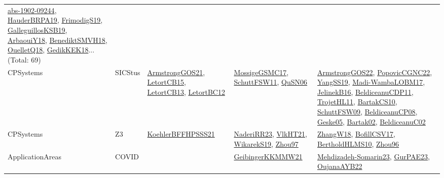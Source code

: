 {\begin{longtable}{lp{3cm}>{\raggedright}p{6cm}>{\raggedright}p{6cm}p{8cm}}
\href{articles/abs-1902-09244.pdf}{abs-1902-09244}\cite{abs-1902-09244}, \href{articles/HauderBRPA19.pdf}{HauderBRPA19}\cite{HauderBRPA19}, \href{papers/FrimodigS19.pdf}{FrimodigS19}\cite{FrimodigS19}, \href{papers/GalleguillosKSB19.pdf}{GalleguillosKSB19}\cite{GalleguillosKSB19}, \href{papers/ArbaouiY18.pdf}{ArbaouiY18}\cite{ArbaouiY18}, \href{papers/BenediktSMVH18.pdf}{BenediktSMVH18}\cite{BenediktSMVH18}, \href{papers/OuelletQ18.pdf}{OuelletQ18}\cite{OuelletQ18}, \href{articles/GedikKEK18.pdf}{GedikKEK18}\cite{GedikKEK18}... (Total: 69)\\
CPSystems & SICStus & \href{papers/ArmstrongGOS21.pdf}{ArmstrongGOS21}\cite{ArmstrongGOS21}, \href{articles/LetortCB15.pdf}{LetortCB15}\cite{LetortCB15}, \href{papers/LetortCB13.pdf}{LetortCB13}\cite{LetortCB13}, \href{papers/LetortBC12.pdf}{LetortBC12}\cite{LetortBC12} & \href{papers/MossigeGSMC17.pdf}{MossigeGSMC17}\cite{MossigeGSMC17}, \href{articles/SchuttFSW11.pdf}{SchuttFSW11}\cite{SchuttFSW11}, \href{papers/QuSN06.pdf}{QuSN06}\cite{QuSN06} & \href{papers/ArmstrongGOS22.pdf}{ArmstrongGOS22}\cite{ArmstrongGOS22}, \href{papers/PopovicCGNC22.pdf}{PopovicCGNC22}\cite{PopovicCGNC22}, \href{papers/YangSS19.pdf}{YangSS19}\cite{YangSS19}, \href{papers/Madi-WambaLOBM17.pdf}{Madi-WambaLOBM17}\cite{Madi-WambaLOBM17}, \href{papers/JelinekB16.pdf}{JelinekB16}\cite{JelinekB16}, \href{articles/BeldiceanuCDP11.pdf}{BeldiceanuCDP11}\cite{BeldiceanuCDP11}, \href{articles/TrojetHL11.pdf}{TrojetHL11}\cite{TrojetHL11}, \href{articles/BartakCS10.pdf}{BartakCS10}\cite{BartakCS10}, \href{papers/SchuttFSW09.pdf}{SchuttFSW09}\cite{SchuttFSW09}, \href{papers/BeldiceanuCP08.pdf}{BeldiceanuCP08}\cite{BeldiceanuCP08}, \href{papers/Geske05.pdf}{Geske05}\cite{Geske05}, \href{papers/Bartak02.pdf}{Bartak02}\cite{Bartak02}, \href{papers/BeldiceanuC02.pdf}{BeldiceanuC02}\cite{BeldiceanuC02}\\
CPSystems & Z3 & \href{articles/KoehlerBFFHPSSS21.pdf}{KoehlerBFFHPSSS21}\cite{KoehlerBFFHPSSS21} & \href{articles/NaderiRR23.pdf}{NaderiRR23}\cite{NaderiRR23}, \href{articles/VlkHT21.pdf}{VlkHT21}\cite{VlkHT21}, \href{articles/WikarekS19.pdf}{WikarekS19}\cite{WikarekS19}, \href{articles/Zhou97.pdf}{Zhou97}\cite{Zhou97} & \href{articles/ZhangW18.pdf}{ZhangW18}\cite{ZhangW18}, \href{papers/BofillCSV17.pdf}{BofillCSV17}\cite{BofillCSV17}, \href{papers/BertholdHLMS10.pdf}{BertholdHLMS10}\cite{BertholdHLMS10}, \href{papers/Zhou96.pdf}{Zhou96}\cite{Zhou96}\\
ApplicationAreas & COVID &  & \href{papers/GeibingerKKMMW21.pdf}{GeibingerKKMMW21}\cite{GeibingerKKMMW21} & \href{papers/Mehdizadeh-Somarin23.pdf}{Mehdizadeh-Somarin23}\cite{Mehdizadeh-Somarin23}, \href{articles/GurPAE23.pdf}{GurPAE23}\cite{GurPAE23}, \href{papers/OujanaAYB22.pdf}{OujanaAYB22}\cite{OujanaAYB22}\\

\end{longtable}}
